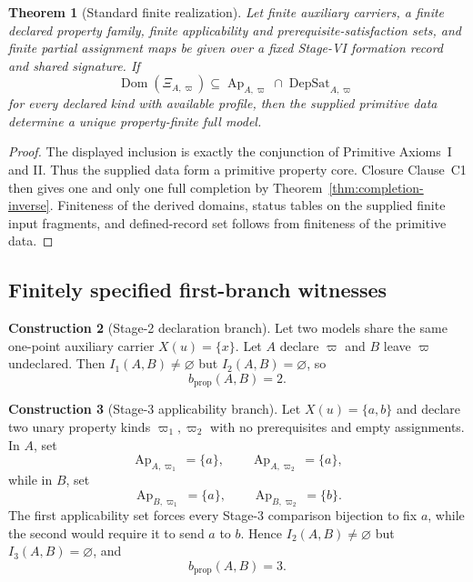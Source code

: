 \documentclass[11pt]{article}
\newcommand{\Ap}{\operatorname{Ap}}
\newcommand{\DepSat}{\operatorname{DepSat}}
\newcommand{\Dom}{\operatorname{Dom}}
\newtheorem{theorem}{Theorem}[section]
\theoremstyle{definition}
\newtheorem{construction}[theorem]{Construction}
\theoremstyle{remark}
\begin{document}
\begin{theorem}[Standard finite realization]
\label{thm:finite-realization}
Let finite auxiliary carriers, a finite declared property family, finite applicability and prerequisite-satisfaction sets, and finite partial assignment maps be given over a fixed Stage-VI formation record and shared signature.
If
\[
\Dom(\Xi_{A,\varpi})
\subseteq
\Ap_{A,\varpi}\cap\DepSat_{A,\varpi}
\]
for every declared kind with available profile, then the supplied primitive data determine a unique property-finite full model.
\end{theorem}

\begin{proof}
The displayed inclusion is exactly the conjunction of Primitive Axioms~I and II.
Thus the supplied data form a primitive property core.
Closure Clause~C1 then gives one and only one full completion by Theorem~\ref{thm:completion-inverse}.
Finiteness of the derived domains, status tables on the supplied finite input fragments, and defined-record set follows from finiteness of the primitive data.
\end{proof}

\subsection{Finitely specified first-branch witnesses}

\begin{construction}[Stage-2 declaration branch]
Let two models share the same one-point auxiliary carrier \(X(u)=\{x\}\).
Let \(A\) declare \(\varpi\) and \(B\) leave \(\varpi\) undeclared.
Then \(I_1(A,B)\neq\varnothing\) but \(I_2(A,B)=\varnothing\), so
\[
b_{\mathrm{prop}}(A,B)=2.
\]
\end{construction}

\begin{construction}[Stage-3 applicability branch]
Let \(X(u)=\{a,b\}\) and declare two unary property kinds \(\varpi_1,\varpi_2\) with no prerequisites and empty assignments.
In \(A\), set
\[
\Ap_{A,\varpi_1}=\{a\},
\qquad
\Ap_{A,\varpi_2}=\{a\},
\]
while in \(B\), set
\[
\Ap_{B,\varpi_1}=\{a\},
\qquad
\Ap_{B,\varpi_2}=\{b\}.
\]
The first applicability set forces every Stage-3 comparison bijection to fix \(a\), while the second would require it to send \(a\) to \(b\).
Hence \(I_2(A,B)\neq\varnothing\) but \(I_3(A,B)=\varnothing\), and
\[
b_{\mathrm{prop}}(A,B)=3.
\]
\end{construction}
\end{document}

